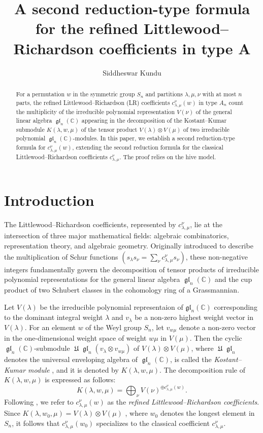 \documentclass[11pt,reqno]{amsart}
\title[A second reduction-type formula for the refined LR coefficients in type A]{A second reduction-type formula for the refined Littlewood--Richardson coefficients in type A}
\author[]{Siddheswar Kundu}
\DeclareMathOperator{\U}{\mathfrak{U}}
\DeclareMathOperator{\gl}{\mathfrak{gl}}
\begin{document}
\begin{abstract}
For a permutation $w$ in the symmetric group $S_n$ and partitions $\lambda, \mu, \nu $ with at most $n$ parts,
the refined Littlewood--Richardson (LR) coefficients $c^{\nu}_{\lambda,\mu}(w)$ in type $A_n$ count the multiplicity of the irreducible polynomial representation $V(\nu)$ of the general linear algebra $\gl_n(\mathbb{C})$ appearing in the decomposition of the Kostant--Kumar submodule $K(\lambda,w,\mu)$ of the tensor product $V(\lambda) \otimes V(\mu)$ of two irreducible polynomial $\gl_n(\mathbb{C})$-modules. In this paper, we establish a second reduction-type formula for $c^{\nu}_{\lambda,\mu}(w)$, extending the second reduction formula for the classical Littlewood--Richardson coefficients $c^{\nu}_{\lambda,\mu}$. The proof relies on the hive model.     
\end{abstract}
\maketitle
\section{Introduction}
The Littlewood--Richardson coefficients, represented by $c^{\nu}_{\lambda,\mu}$, lie at the intersection of three major mathematical fields: algebraic combinatorics, representation theory, and algebraic geometry. Originally introduced to describe the multiplication of Schur functions $(s_{\lambda}s_{\nu}=\sum_{\nu}c^{\nu}_{\lambda,\mu}s_{\nu})$, these non-negative integers fundamentally govern the decomposition of tensor products of irreducible polynomial representations for the general linear algebra $\gl_n(\mathbb{C})$ and the cup product of two Schubert classes in the cohomology ring of a Grassmannian.

Let $V(\lambda)$ be the irreducible polynomial representaion of $\mathfrak{gl}_n(\mathbb{C})$ corresponding to the dominant integral weight $\lambda$ and $v_{\lambda}$ be a non-zero highest weight vector in $V(\lambda)$. For an element $w$ of the Weyl group $S_n$, let $v_{w\mu}$ denote a non-zero vector in the one-dimensional weight space of weight $w\mu$ in $V(\mu)$. Then the cyclic $\gl_n(\mathbb{C})$-submodule $\U\gl_n(v_{\lambda} \otimes v_{w\mu})$ of $V(\lambda) \otimes V(\mu)$, where $\U\gl_n$ denotes the universal enveloping algebra of $\gl_n(\mathbb{C})$, is called the {\em Kostant--Kumar module} \cite[\S5]{Mrigendra:adv:arxiv}, and it is denoted by $K(\lambda, w, \mu)$. The decomposition rule of $K(\lambda, w, \mu)$ \cite[\S9.4]{Mrigendra:adv:arxiv} is expressed as follows:
$$ K(\lambda, w, \mu)= \bigoplus_{\nu} V(\nu)^{\oplus c^{\nu}_{\lambda,\mu}(w)}.$$
Following \cite[\S9.3.2]{Mrigendra:adv:arxiv}, we refer to $c^{\nu}_{\lambda,\mu}(w)$ as the {\em refined Littlewood--Richardson coefficients}. Since $K(\lambda, w_0, \mu) = V(\lambda) \otimes V(\mu)$ \cite[Remark 5.3]{Mrigendra:adv:arxiv}, where $w_0$ denotes the longest element in $S_n$, it follows that $c^{\nu}_{\lambda,\mu}(w_0)$ specializes to the classical coefficient $c^{\nu}_{\lambda,\mu}$.
\end{document}
